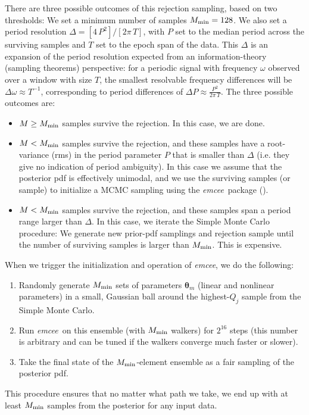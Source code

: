 \documentclass[manuscript, letterpaper]{aastex6}
\newcommand{\project}[1]{\textsl{#1}}
\newcommand{\emcee}{\project{emcee}}
\newcommand{\bs}[1]{\boldsymbol{#1}}
\newcommand{\resp}[1]{{\color{mahogany}#1}}
\begin{document}
There are three possible outcomes of this rejection sampling, based on two
thresholds:
We set a minimum number of samples $M_{\rm min}=128$.
We also set a period resolution $\Delta = [4\,P^2] / [2\pi\,T]$, with
$P$ set to the median period across the surviving samples and $T$ set to
the epoch span of the data.
This $\Delta$ is an expansion of the period resolution expected from an
information-theory (sampling theorems) perspective:
for a periodic signal with frequency $\omega$ observed over a window with size
$T$, the smallest resolvable frequency differences will be $\Delta\omega \approx
T^{-1}$, corresponding to period differences of $\Delta P \approx
\frac{P^2}{2\pi\,T}$.
The three possible outcomes are:
\begin{itemize}\itemsep0ex
\item $M\geq M_{\rm min}$ samples survive the rejection.
  In this case, we are done.
\item $M<M_{\rm min}$ samples survive the rejection, and these samples have a
  root-variance (rms) in the period parameter $P$ that is smaller than $\Delta$
  (i.e. they give no indication of period ambiguity).
  In this case we assume that the posterior pdf is effectively unimodal, and we
  use the surviving samples (or sample) to initialize a MCMC sampling using the
  \emcee\ package (\citealt{Foreman-Mackey:2013}).
\item $M<M_{\rm min}$ samples survive the rejection, and these samples
  span a period range larger than $\Delta$.
  In this case, we iterate the Simple Monte Carlo procedure: We generate new
  prior-pdf samplings and rejection sample until the number of surviving samples
  is larger than $M_{\rm min}$.
  This is expensive.
\end{itemize}
When we trigger the \resp{initialization} and operation of \emcee, we do the
following:
\begin{enumerate}\itemsep0ex
\item Randomly generate $M_{\rm min}$ sets of parameters $\bs{\theta}_m$
  (linear and nonlinear parameters) in a small, Gaussian ball around
  the highest-$Q_j$ sample from the Simple Monte Carlo.
\item Run \emcee\ on this ensemble (with $M_{\rm min}$ walkers) for $2^{16}$
  steps \resp{(this number is arbitrary and can be tuned if the walkers converge
  much faster or slower)}.
\item Take the final state of the $M_{\rm min}$-element ensemble as a
  fair sampling of the posterior pdf.
\end{enumerate}
This procedure ensures that no matter what path we take, we end up with
at least $M_{\rm min}$ samples from the posterior for any input data.
\end{document}
